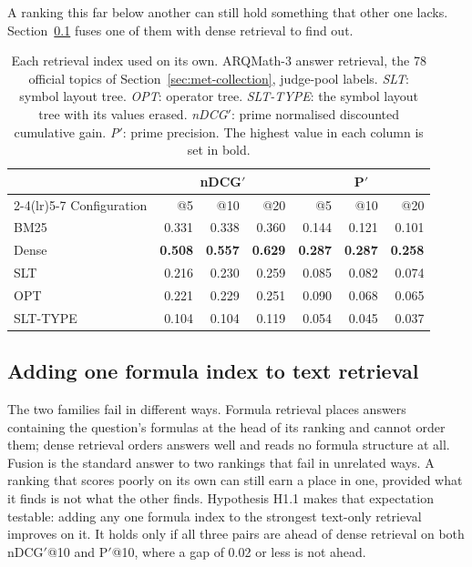 A ranking this far below another can still hold something that other one lacks.
Section~\ref{sec:res-add-one} fuses one of them with dense retrieval to find out.

\begin{table}[t]
\centering
\small
\renewcommand{\arraystretch}{1.15}
\begin{tabular}{lrrrrrr}
\toprule
& \multicolumn{3}{c}{nDCG$'$} & \multicolumn{3}{c}{P$'$} \\
\cmidrule(lr){2-4}\cmidrule(lr){5-7}
Configuration & @5 & @10 & @20 & @5 & @10 & @20 \\
\midrule
BM25             & 0.331 & 0.338 & 0.360 & 0.144 & 0.121 & 0.101 \\
Dense            & \textbf{0.508} & \textbf{0.557} & \textbf{0.629} & \textbf{0.287} & \textbf{0.287} & \textbf{0.258} \\
\addlinespace
SLT              & 0.216 & 0.230 & 0.259 & 0.085 & 0.082 & 0.074 \\
OPT              & 0.221 & 0.229 & 0.251 & 0.090 & 0.068 & 0.065 \\
SLT-TYPE         & 0.104 & 0.104 & 0.119 & 0.054 & 0.045 & 0.037 \\
\bottomrule
\end{tabular}
\caption[Each retrieval index on its own]{Each retrieval index used on its own. ARQMath-3 answer retrieval, the 78 official
topics of Section~\ref{sec:met-collection}, judge-pool labels. \emph{SLT}: symbol layout tree.
\emph{OPT}: operator tree. \emph{SLT-TYPE}: the symbol layout tree with its values erased.
\emph{nDCG$'$}: prime normalised discounted cumulative gain. \emph{P$'$}: prime precision. The
highest value in each column is set in bold.}
\label{tab:res-single-index}
\end{table}

\subsection{Adding one formula index to text retrieval}\label{sec:res-add-one}

The two families fail in different ways. Formula retrieval places answers containing the
question's formulas at the head of its ranking and cannot order them; dense retrieval orders
answers well and reads no formula structure at all. Fusion is the standard answer to two
rankings that fail in unrelated ways. A ranking that scores poorly on its own can still earn a
place in one, provided what it finds is not what the other finds. Hypothesis H1.1 makes that
expectation testable: adding any one formula index to the strongest text-only retrieval
improves on it. It holds only if all three pairs are ahead of dense retrieval on both
nDCG$'$@10 and P$'$@10, where a gap of 0.02 or less is not ahead.

